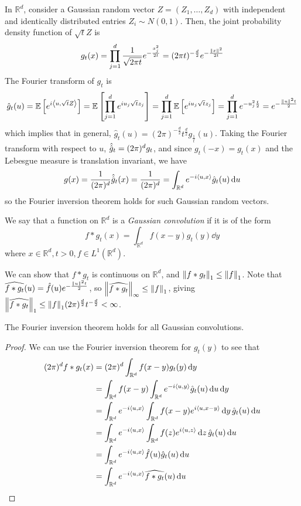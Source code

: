 In \( \mathbb R^d \), consider a Gaussian random vector \( Z = (Z_1, \dots, Z_d) \) with independent and identically distributed entries \( Z_i \sim N(0,1) \).
Then, the joint probability density function of \( \sqrt{t}Z \) is
\[ g_t(x) = \prod_{j=1}^d \frac{1}{\sqrt{2\pi t}} e^{-\frac{x_j^2}{2t}} = (2\pi t)^{-\frac{d}{2}} e^{-\frac{\norm{x}^2}{2t}} \]
The Fourier transform of \( g_t \) is
\[ \hat g_t(u) = \mathbb{E}\left[{e^{i\left\langle{u,\sqrt{t}Z}\right\rangle}}\right] = \mathbb{E}\left[{\prod_{j=1}^d e^{iu_j \sqrt{t} z_j}}\right] = \prod_{j=1}^d \mathbb{E}\left[{e^{iu_j \sqrt{t} z_j}}\right] = \prod_{j=1}^d e^{-u_j^2 \frac{t}{2}} = e^{-\frac{\norm{u}^2 t}{2}} \]
which implies that in general, \( \hat g_t(u) = (2\pi)^{-\frac{d}{2}} t^{\frac{d}{2}} g_{\frac{1}{t}}(u) \).
Taking the Fourier transform with respect to \( u \), \( \hat{\hat{g}}_t = (2\pi)^d g_t \), and since \( g_t(-x) = g_t(x) \) and the Lebesgue measure is translation invariant, we have
\[ g(x) = \frac{1}{(2\pi)^d} \hat{\hat{g}}_t(x) = \frac{1}{(2\pi)^d} = \int_{\mathbb R^d} e^{-i\left\langle{u,x}\right\rangle} \hat g_t(u) \dd{u} \]
so the Fourier inversion theorem holds for such Gaussian random vectors.
\begin{definition}
	We say that a function on \( \mathbb R^d \) is a \emph{Gaussian convolution} if it is of the form
	\[ f \ast g_t(x) = \int_{\mathbb R^d} f(x-y) g_t(y) \dd{y} \]
	where \( x \in \mathbb R^d, t > 0, f \in L^1(\mathbb R^d) \).
\end{definition}
We can show that \( f \ast g_t \) is continuous on \( \mathbb R^d \), and \( \norm{f \ast g_t}_1 \leq \norm{f}_1 \).
Note that \( \widehat{f \ast g_t}(u) = \hat f(u) e^{-\frac{\norm{u}^2 t}{2}} \), so \( \norm{\widehat{f \ast g_t}}_\infty \leq \norm{f}_1 \), giving \( \norm{\widehat{f \ast g_t}}_1 \leq \norm{f}_1 (2\pi)^{\frac{d}{2}} t^{-\frac{d}{2}} < \infty \).
\begin{lemma}
	The Fourier inversion theorem holds for all Gaussian convolutions.
\end{lemma}
\begin{proof}
	We can use the Fourier inversion theorem for \( g_t(y) \) to see that
	\begin{align*}
		(2\pi)^d f \ast g_t(x) &= (2\pi)^d \int_{\mathbb R^d} f(x-y) g_t(y) \dd{y} \\
		&= \int_{\mathbb R^d} f(x-y) \int_{\mathbb R^d} e^{-i\left\langle{u,y}\right\rangle} \hat g_t(u) \dd{u} \dd{y} \\
		&= \int_{\mathbb R^d} e^{-i\left\langle{u,x}\right\rangle} \int_{\mathbb R^d} f(x-y) e^{i\left\langle{u,x-y}\right\rangle} \dd{y} \hat g_t(u) \dd{u} \\
		&= \int_{\mathbb R^d} e^{-i\left\langle{u,x}\right\rangle} \int_{\mathbb R^d} f(z) e^{i\left\langle{u,z}\right\rangle} \dd{z} \hat g_t(u) \dd{u} \\
		&= \int_{\mathbb R^d} e^{-i\left\langle{u,x}\right\rangle} \hat f(u) \hat g_t(u) \dd{u} \\
		&= \int_{\mathbb R^d} e^{-i\left\langle{u,x}\right\rangle} \widehat{f \ast g_t}(u) \dd{u}
	\end{align*}
\end{proof}
